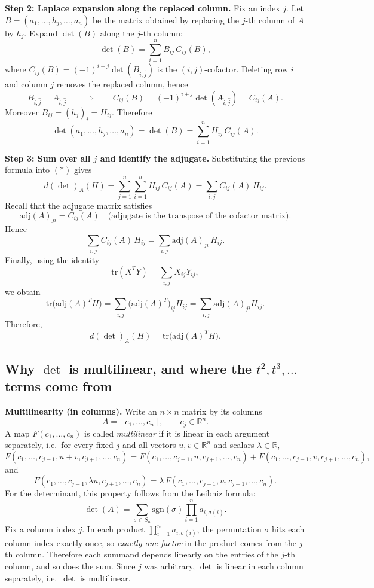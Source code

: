\documentclass[12pt,a4paper]{article}
\theoremstyle{plain}
\theoremstyle{definition}      %
\begin{document}
	\medskip
	\noindent\textbf{Step 2: Laplace expansion along the replaced column.}
	Fix an index $j$. Let $B=(a_1,\dots,h_j,\dots,a_n)$ be the matrix obtained by replacing the $j$-th column of $A$ by $h_j$.
	Expand $\det(B)$ along the $j$-th column:
	\[
	\det(B)=\sum_{i=1}^n B_{ij}\,C_{ij}(B),
	\]
	where $C_{ij}(B)=(-1)^{i+j}\det(B_{\widehat{i},\widehat{j}})$ is the $(i,j)$-cofactor.
	Deleting row $i$ and column $j$ removes the replaced column, hence
	\[
	B_{\widehat{i},\widehat{j}}=A_{\widehat{i},\widehat{j}}
	\qquad\Longrightarrow\qquad
	C_{ij}(B)=(-1)^{i+j}\det(A_{\widehat{i},\widehat{j}})=C_{ij}(A).
	\]
	Moreover $B_{ij}=(h_j)_i=H_{ij}$. Therefore
	\[
	\det(a_1,\dots,h_j,\dots,a_n)=\det(B)=\sum_{i=1}^n H_{ij}\,C_{ij}(A).
	\]
	
	\medskip
	\noindent\textbf{Step 3: Sum over all $j$ and identify the adjugate.}
	Substituting the previous formula into $(\ast)$ gives
	\[
	d(\det)_A(H)=\sum_{j=1}^n\sum_{i=1}^n H_{ij}\,C_{ij}(A)
	=\sum_{i,j} C_{ij}(A)\,H_{ij}.
	\]
	Recall that the adjugate matrix satisfies
	\[
	\mathrm{adj}(A)_{ji}=C_{ij}(A)
	\quad\text{(adjugate is the transpose of the cofactor matrix).}
	\]
	Hence
	\[
	\sum_{i,j} C_{ij}(A)\,H_{ij}
	=\sum_{i,j} \mathrm{adj}(A)_{ji}\,H_{ij}.
	\]
	Finally, using the identity
	\[
	\mathrm{tr}(X^T Y)=\sum_{i,j} X_{ij}Y_{ij},
	\]
	we obtain
	\[
	\mathrm{tr}\big(\mathrm{adj}(A)^T H\big)
	=\sum_{i,j} \big(\mathrm{adj}(A)^T\big)_{ij}H_{ij}
	=\sum_{i,j} \mathrm{adj}(A)_{ji}H_{ij}.
	\]
	Therefore,
	\[
	d(\det)_A(H)=\mathrm{tr}\big(\mathrm{adj}(A)^T H\big).
	\]
	
	\subsection*{Why $\det$ is multilinear, and where the $t^2,t^3,\dots$ terms come from}
	
	\noindent\textbf{Multilinearity (in columns).}
	Write an $n\times n$ matrix by its columns
	\[
	A=[c_1,\dots,c_n],\qquad c_j\in\mathbb{R}^n.
	\]
	A map $F(c_1,\dots,c_n)$ is called \emph{multilinear} if it is linear in each argument separately, i.e.\ for every
	fixed $j$ and all vectors $u,v\in\mathbb{R}^n$ and scalars $\lambda\in\mathbb{R}$,
	\[
	F(c_1,\dots,c_{j-1},u+v,c_{j+1},\dots,c_n)
	=
	F(c_1,\dots,c_{j-1},u,c_{j+1},\dots,c_n)
	+
	F(c_1,\dots,c_{j-1},v,c_{j+1},\dots,c_n),
	\]
	and
	\[
	F(c_1,\dots,c_{j-1},\lambda u,c_{j+1},\dots,c_n)
	=
	\lambda\,F(c_1,\dots,c_{j-1},u,c_{j+1},\dots,c_n).
	\]
	For the determinant, this property follows from the Leibniz formula:
	\[
	\det(A)=\sum_{\sigma\in S_n}\mathrm{sgn}(\sigma)\prod_{i=1}^n a_{i,\sigma(i)}.
	\]
	Fix a column index $j$. In each product $\prod_{i=1}^n a_{i,\sigma(i)}$, the permutation $\sigma$ hits each column
	index exactly once, so \emph{exactly one factor} in the product comes from the $j$-th column. Therefore each summand
	depends linearly on the entries of the $j$-th column, and so does the sum. Since $j$ was arbitrary, $\det$ is linear
	in each column separately, i.e.\ $\det$ is multilinear.
	
\end{document}
